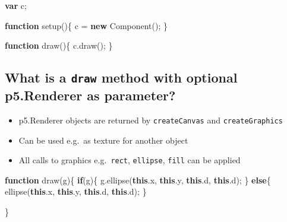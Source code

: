 \documentclass[]{article}
\newenvironment{Shaded}{}{}
\newcommand{\AttributeTok}[1]{\textcolor[rgb]{0.49,0.56,0.16}{#1}}
\newcommand{\ControlFlowTok}[1]{\textcolor[rgb]{0.00,0.44,0.13}{\textbf{#1}}}
\newcommand{\KeywordTok}[1]{\textcolor[rgb]{0.00,0.44,0.13}{\textbf{#1}}}
\newcommand{\NormalTok}[1]{#1}
\newcommand{\OperatorTok}[1]{\textcolor[rgb]{0.40,0.40,0.40}{#1}}
\newcommand{\VariableTok}[1]{\textcolor[rgb]{0.10,0.09,0.49}{#1}}
\providecommand{\tightlist}{%
  \setlength{\itemsep}{0pt}\setlength{\parskip}{0pt}}
\begin{document}
\begin{Shaded}
\begin{Highlighting}[]
\KeywordTok{var}\NormalTok{ c}\OperatorTok{;}

\KeywordTok{function} \AttributeTok{setup}\NormalTok{()}\OperatorTok{\{}
\NormalTok{   c }\OperatorTok{=} \KeywordTok{new} \AttributeTok{Component}\NormalTok{()}\OperatorTok{;}
\OperatorTok{\}}

\KeywordTok{function} \AttributeTok{draw}\NormalTok{()}\OperatorTok{\{}
   \VariableTok{c}\NormalTok{.}\AttributeTok{draw}\NormalTok{()}\OperatorTok{;}
\OperatorTok{\}}
\end{Highlighting}
\end{Shaded}

\hypertarget{what-is-a-draw-method-with-optional-p5.renderer-as-parameter}{%
\subsection{\texorpdfstring{What is a \texttt{draw} method with optional
p5.Renderer as
parameter?}{What is a draw method with optional p5.Renderer as parameter?}}\label{what-is-a-draw-method-with-optional-p5.renderer-as-parameter}}

\begin{itemize}
\tightlist
\item
  p5.Renderer objects are returned by \texttt{createCanvas} and
  \texttt{createGraphics}
\item
  Can be used e.g.~as texture for another object
\item
  All calls to graphics e.g.~\texttt{rect}, \texttt{ellipse},
  \texttt{fill} can be applied
\end{itemize}

\begin{Shaded}
\begin{Highlighting}[]
\KeywordTok{function} \AttributeTok{draw}\NormalTok{(g)}\OperatorTok{\{}
  \ControlFlowTok{if}\NormalTok{(g)}\OperatorTok{\{}
    \VariableTok{g}\NormalTok{.}\AttributeTok{ellipse}\NormalTok{(}\KeywordTok{this}\NormalTok{.}\AttributeTok{x}\OperatorTok{,} \KeywordTok{this}\NormalTok{.}\AttributeTok{y}\OperatorTok{,} \KeywordTok{this}\NormalTok{.}\AttributeTok{d}\OperatorTok{,} \KeywordTok{this}\NormalTok{.}\AttributeTok{d}\NormalTok{)}\OperatorTok{;}
  \OperatorTok{\}}
  \ControlFlowTok{else}\OperatorTok{\{}
    \AttributeTok{ellipse}\NormalTok{(}\KeywordTok{this}\NormalTok{.}\AttributeTok{x}\OperatorTok{,} \KeywordTok{this}\NormalTok{.}\AttributeTok{y}\OperatorTok{,} \KeywordTok{this}\NormalTok{.}\AttributeTok{d}\OperatorTok{,} \KeywordTok{this}\NormalTok{.}\AttributeTok{d}\NormalTok{)}\OperatorTok{;}
  \OperatorTok{\}}

\OperatorTok{\}}
\end{Highlighting}
\end{Shaded}
\end{document}
